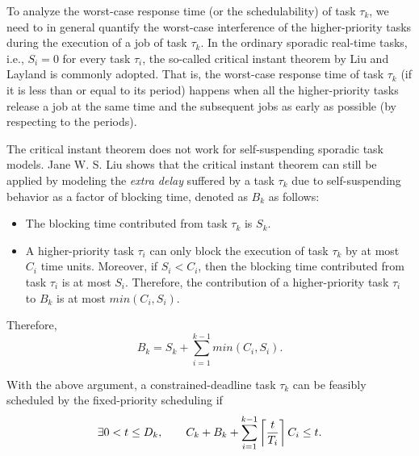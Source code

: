 To analyze the worst-case response time (or the schedulability) of task $\tau_k$, we need to in general quantify the worst-case interference of the higher-priority tasks during the execution of a job of task $\tau_k$. In the ordinary sporadic real-time tasks, i.e., $S_i=0$ for every task $\tau_i$, the so-called critical instant theorem by Liu and Layland \cite{Liu_1973} is commonly adopted. That is, the worst-case response time of task $\tau_k$ (if it is less than or equal to its period) happens when all the higher-priority tasks release a job at the same time and the subsequent jobs as early as possible (by respecting to the periods). 

The critical instant theorem does not work for self-suspending sporadic task models.  
Jane W. S. Liu \cite{Liu:2000:RS:518501} shows that the critical instant theorem can still be applied by modeling the \emph{extra delay} suffered by a task $\tau_k$ due to self-suspending behavior as a factor of blocking time, denoted as $B_k$ as follows:
\begin{itemize}
\item The blocking time contributed from task $\tau_k$ is $S_k$.
\item A higher-priority task $\tau_i$ can only block the execution of task $\tau_k$ by at most $C_i$ time units. Moreover, if $S_i < C_i$, then the blocking time contributed from task $\tau_i$ is at most $S_i$. Therefore, the contribution of a higher-priority task $\tau_i$  to $B_k$ is at most $min(C_i, S_i)$.
\end{itemize}
Therefore, 
\begin{equation}
\label{eq:Bk}
B_k = S_k + \sum_{i=1}^{k-1} min(C_i, S_i).
\end{equation}

With the above argument, a constrained-deadline task $\tau_k$ can be feasibly scheduled by the fixed-priority scheduling if
\begin{equation}
\label{eq:TDA-suspension}
\exists 0 < t \leq D_k, \qquad C_k + B_k + \sum_{i=1}^{k-1}\left\lceil{\frac{t}{T_i}}\right\rceil C_i \leq t.
\end{equation}
  
  
  